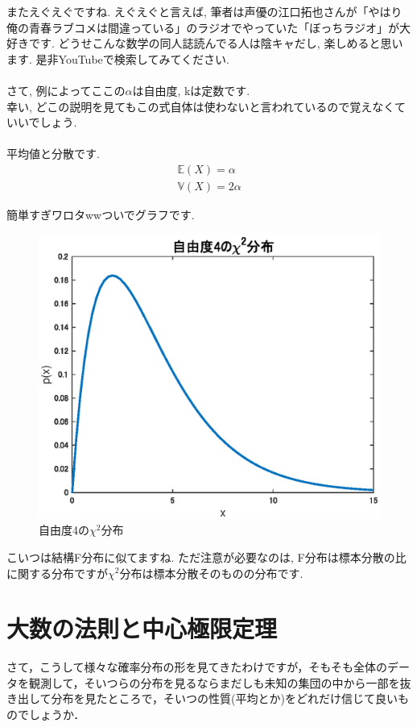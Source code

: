 \documentclass[11pt,a4paper,uplatex]{ujreport} 	%
\begin{document}
またえぐえぐですね. えぐえぐと言えば, 筆者は声優の江口拓也さんが「やはり俺の青春ラブコメは間違っている」のラジオでやっていた「ぼっちラジオ」が大好きです. どうせこんな数学の同人誌読んでる人は陰キャだし, 楽しめると思います. 是非YouTubeで検索してみてください.\\
\\

さて, 例によってここの$\alpha$は自由度, kは定数です.\\

幸い, どこの説明を見てもこの式自体は使わないと言われているので覚えなくていいでしょう.\\
\\

平均値と分散です.
\begin{align}
\mathbb{E}(X) = \alpha \\
\mathbb{V}(X) = 2\alpha
\end{align}

簡単すぎワロタwwついでグラフです.


\begin{figure}[H]
\label{im:chi}
  \centering
  \includegraphics[width=120mm]{../figures/chi2.eps}
  \caption{自由度4の$\chi^2$分布}
\end{figure}
 
こいつは結構F分布に似てますね. ただ注意が必要なのは, F分布は標本分散の比に関する分布ですが$\chi^2$分布は標本分散そのものの分布です.


\chapter{大数の法則と中心極限定理}
さて，こうして様々な確率分布の形を見てきたわけですが，そもそも全体のデータを観測して，そいつらの分布を見るならまだしも未知の集団の中から一部を抜き出して分布を見たところで，そいつの性質(平均とか)をどれだけ信じて良いものでしょうか．\\
\end{document}
